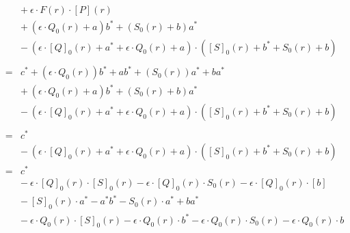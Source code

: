 \documentclass[twoside,11pt,openright]{report}
\begin{document}
\begin{align*}
               &   & +\ \epsilon \cdot F(r) \cdot [P](r)                                                                                                               \\
               &   & +\ (\epsilon \cdot Q_0(r) + a) b^* + (S_0(r)  + b)a^*                                                                                             \\
               &   & -\ (\epsilon \cdot {[Q]}_0(r) + a^* + \epsilon \cdot Q_0(r) + a) \cdot ({[S]}_0(r) + b^* + S_0(r)  + b)                                           \\\\
               & = & c^* + (\epsilon \cdot Q_0(r))b^* + ab^* + (S_0(r))a^* + ba^*                                                                                      \\
               &   & +\ (\epsilon \cdot Q_0(r) + a) b^* + (S_0(r)  + b)a^*                                                                                             \\
               &   & -\ (\epsilon \cdot {[Q]}_0(r) + a^* + \epsilon \cdot Q_0(r) + a) \cdot ({[S]}_0(r) + b^* + S_0(r)  + b)                                           \\\\
               & = & c^*                                                                                                                                               \\
               &   & -\ (\epsilon \cdot {[Q]}_0(r) + a^* + \epsilon \cdot Q_0(r) + a) \cdot ({[S]}_0(r) + b^* + S_0(r)  + b)                                           \\
               & = & c^*                                                                                                                                               \\
               &   & -\ \epsilon \cdot {[Q]}_0(r) \cdot {[S]}_0(r) - \epsilon \cdot {[Q]}_0(r) \cdot S_0(r) -  \epsilon \cdot {[Q]}_0(r) \cdot[b]                      \\
               &   & -\  {[S]}_0(r) \cdot a^* - a^*b^* - S_0(r) \cdot a^* + ba^*                                                                                       \\
               &   & -\  \epsilon \cdot Q_0(r) \cdot {[S]}_0(r) - \epsilon \cdot Q_0(r) \cdot b^* - \epsilon \cdot Q_0(r) \cdot S_0(r) - \epsilon \cdot Q_0(r) \cdot b \\

\end{align*}
\end{document}
